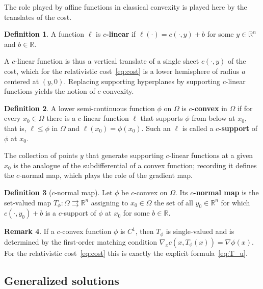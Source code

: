 \documentclass[12pt,letterpaper]{amsart}
\theoremstyle{definition}
\newtheorem{definition}{Definition}[section]
\newtheorem{remark}[definition]{Remark}
\theoremstyle{plain}
\numberwithin{equation}{section}
\newcommand{\R}{\mathbb{R}}
\newcommand{\D}{\nabla}
\newcommand{\Om}{\Omega}
\begin{document}
The role played by affine functions in classical convexity is played here by the translates of
the cost.

\begin{definition}\label{def:c-linear}
    A function $\ell$ is {\bf $c$-linear} if $\ell(\cdot)=c(\cdot,y)+b$ for some $y\in\R^n$ and
    $b\in\R$.
\end{definition}

A $c$-linear function is thus a vertical translate of a single sheet $c(\cdot,y)$ of the cost,
which for the relativistic cost~\eqref{eq:cost} is a lower hemisphere of radius $a$ centered at
$(y,0)$. Replacing supporting hyperplanes by supporting $c$-linear functions yields the notion
of $c$-convexity.

\begin{definition}\label{def:c-convex}
    A lower semi-continuous function $\phi$ on $\Om$ is {\bf $c$-convex} in $\Om$ if for every
    $x_0\in\Om$ there is a $c$-linear function $\ell$ that supports $\phi$ from below at $x_0$,
    that is, $\ell\leq\phi$ in $\Om$ and $\ell(x_0)=\phi(x_0)$. Such an $\ell$ is called a
    {\bf $c$-support} of $\phi$ at $x_0$.
\end{definition}

The collection of points $y$ that generate supporting $c$-linear functions at a given $x_0$
is the analogue of the subdifferential of a convex function; recording it defines the
$c$-normal map, which plays the role of the gradient map.

\begin{definition}[$c$-normal map]\label{def:c-normal}
    Let $\phi$ be $c$-convex on $\Om$. Its {\bf $c$-normal map} is the set-valued map
    $T_\phi:\Om\rightrightarrows\R^n$ assigning to $x_0\in\Om$ the set of all $y_0\in\R^n$ for
    which $c(\cdot,y_0)+b$ is a $c$-support of $\phi$ at $x_0$ for some $b\in\R$.
\end{definition}

\begin{remark}\label{rk:c-normal}
    If a $c$-convex function $\phi$ is $C^1$, then $T_\phi$ is single-valued and is determined
    by the first-order matching condition $\D_xc(x,T_\phi(x))=\D\phi(x)$. For the relativistic
    cost~\eqref{eq:cost} this is exactly the explicit formula~\eqref{eq:T_u}.
\end{remark}

\subsection{Generalized solutions}
\end{document}
